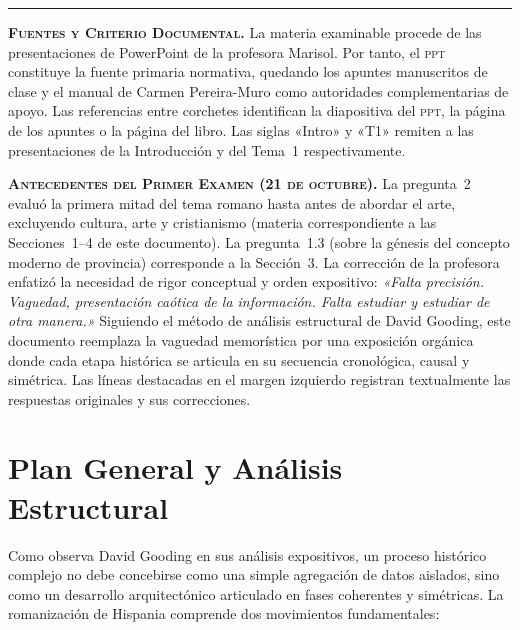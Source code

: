 \documentclass[11pt,letterpaper]{article}
\begin{document}
\vspace{0.4em}
\noindent\rule{\linewidth}{0.4pt}
\vspace{0.6em}

\textbf{\textsc{Fuentes y Criterio Documental.}} La materia examinable procede de las presentaciones de PowerPoint de la profesora Marisol. Por tanto, el \textsc{ppt} constituye la fuente primaria normativa, quedando los apuntes manuscritos de clase y el manual de Carmen Pereira-Muro como autoridades complementarias de apoyo. Las referencias entre corchetes identifican la diapositiva del \textsc{ppt}, la página de los apuntes o la página del libro. Las siglas «Intro» y «T1» remiten a las presentaciones de la Introducción y del Tema~1 respectivamente.

\textbf{\textsc{Antecedentes del Primer Examen (21 de octubre).}} La pregunta~2 evaluó la primera mitad del tema romano hasta antes de abordar el arte, excluyendo cultura, arte y cristianismo (materia correspondiente a las Secciones~1--4 de este documento). La pregunta~1.3 (sobre la génesis del concepto moderno de provincia) corresponde a la Sección~3. La corrección de la profesora enfatizó la necesidad de rigor conceptual y orden expositivo: \emph{«Falta precisión. Vaguedad, presentación caótica de la información. Falta estudiar y estudiar de otra manera.»} Siguiendo el método de análisis estructural de David Gooding, este documento reemplaza la vaguedad memorística por una exposición orgánica donde cada etapa histórica se articula en su secuencia cronológica, causal y simétrica. Las líneas destacadas en el margen izquierdo registran textualmente las respuestas originales y sus correcciones.

\vspace{0.8em}

\section*{Plan General y Análisis Estructural}

\noindent Como observa David Gooding en sus análisis expositivos, un proceso histórico complejo no debe concebirse como una simple agregación de datos aislados, sino como un desarrollo arquitectónico articulado en fases coherentes y simétricas. La romanización de Hispania comprende dos movimientos fundamentales:
\end{document}
